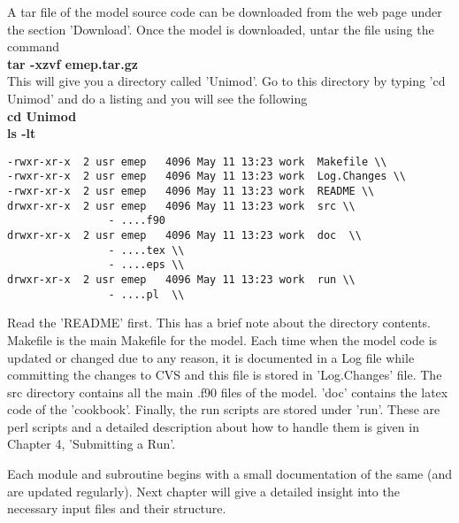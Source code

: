 A tar file of the model source code can be downloaded from the web
page under the section 'Download'.   Once the model is downloaded, untar the file using  the command \\

\textbf{tar -xzvf emep.tar.gz} \\

This will give you a directory called 'Unimod'.  Go to this directory
by typing 'cd Unimod' and do a listing and you will see the following
\\

\textbf{cd Unimod} \\
          \textbf{ls -lt}


\begin{verbatim}
-rwxr-xr-x  2 usr emep   4096 May 11 13:23 work  Makefile \\
-rwxr-xr-x  2 usr emep   4096 May 11 13:23 work  Log.Changes \\
-rwxr-xr-x  2 usr emep   4096 May 11 13:23 work  README \\
drwxr-xr-x  2 usr emep   4096 May 11 13:23 work  src \\
                - ....f90
drwxr-xr-x  2 usr emep   4096 May 11 13:23 work  doc  \\
                - ....tex \\
                - ....eps \\
drwxr-xr-x  2 usr emep   4096 May 11 13:23 work  run \\
                - ....pl  \\

\end{verbatim}

Read the 'README' first.  This has a brief note about the directory
contents.  Makefile is the main Makefile for the model.  Each time
when the model code is updated or changed due to any reason, it is
documented in a Log file while committing the changes to CVS and this
file is stored in 'Log.Changes' file.  The src directory contains all
the main .f90 files of the model. 'doc' contains the latex code of the
'cookbook'.  Finally, the run scripts are stored under 'run'.  These
are perl scripts and a detailed description about how to handle them
is given in Chapter 4, 'Submitting a Run'.  

Each module and subroutine begins with a small documentation of the
same (and are updated regularly). Next chapter will give a detailed
insight into the necessary input files and their structure.    




